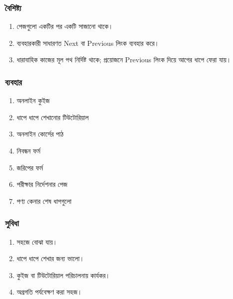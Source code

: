 \par\noindent
\begin{minipage}[t]{.48\linewidth}\vspace{0pt}
\subsubsection{বৈশিষ্ট্য}

\begin{enumerate}
\item পেজগুলো একটির পর একটি সাজানো থাকে।
\item ব্যবহারকারী সাধারণত Next বা Previous লিংক ব্যবহার করে।
\item ধারাবাহিক কাজের মূল পথ নির্দিষ্ট থাকে; প্রয়োজনে Previous লিংক দিয়ে আগের ধাপে ফেরা যায়।
\end{enumerate}
\end{minipage}\hfill
\begin{minipage}[t]{.48\linewidth}\vspace{0pt}
\subsubsection{ব্যবহার}

\begin{enumerate}
\item অনলাইন কুইজ
\item ধাপে ধাপে শেখানোর টিউটোরিয়াল
\item অনলাইন কোর্সের পাঠ
\item নিবন্ধন ফর্ম
\item জরিপের ফর্ম
\item পরীক্ষার নির্দেশনার পেজ
\item পণ্য কেনার শেষ ধাপগুলো
\end{enumerate}
\end{minipage}\par\smallskip
\par\noindent
\begin{minipage}[t]{.48\linewidth}\vspace{0pt}
\subsubsection{সুবিধা}
\begin{enumerate}
\item সহজে বোঝা যায়।
\item ধাপে ধাপে শেখার জন্য ভালো।
\item কুইজ বা টিউটোরিয়াল পরিচালনায় কার্যকর।
\item অগ্রগতি পর্যবেক্ষণ করা সহজ।
\end{enumerate}
\end{minipage}\hfill
